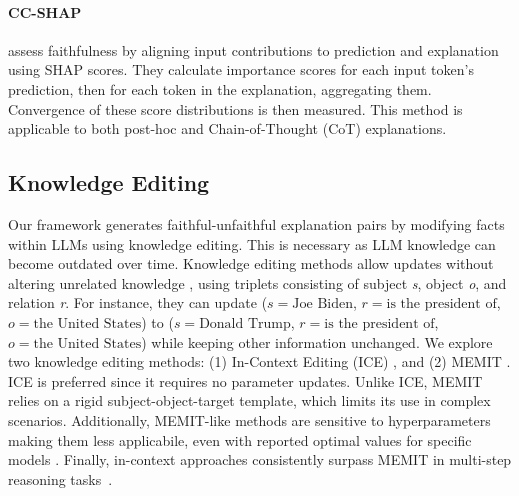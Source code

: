 \paragraph{CC-SHAP} \citet{Parcalabescu2023OnMF} assess faithfulness by aligning input contributions to prediction and explanation using SHAP \citep{Lundberg2017AUA} scores. They calculate importance scores for each input token's prediction, then for each token in the explanation, aggregating them. Convergence of these score distributions is then measured. This method is applicable to both post-hoc and Chain-of-Thought (CoT) explanations.



\subsection{Knowledge Editing}
Our framework generates faithful-unfaithful explanation pairs by modifying facts within LLMs using knowledge editing. This is necessary as LLM knowledge can become outdated over time.  
Knowledge editing methods allow updates without altering unrelated knowledge \citep{cohen2024evaluating,Zhang2024ACS, Patil2023CanSI, geva-etal-2023-dissecting, gupta-etal-2023-editing, hartvigsen2023aging,zheng-etal-2023-edit, Meng2022LocatingAE, mitchell2022fast}, using triplets consisting of subject \textit{s}, object \textit{o}, and relation \textit{r}. For instance, they can update ($s = \text{Joe Biden}$, $r = \text{is the president of}$, $o = \text{the United States}$) to ($s = \text{Donald Trump}$, $r = \text{is the president of}$, $o = \text{the United States}$) while keeping other information unchanged. We explore two knowledge editing methods: (1) In-Context Editing (ICE) \citep{Cohen2023EvaluatingTR}, and (2) MEMIT \citep{meng2023memit}. ICE is preferred since it requires no parameter updates. Unlike ICE, MEMIT relies on a rigid subject-object-target template, which limits its use in complex scenarios. Additionally, MEMIT-like methods are sensitive to hyperparameters making them less applicabile, even with reported optimal values for specific models \citep{Wang2023EasyEditAE}. Finally, in-context approaches consistently surpass MEMIT in multi-step reasoning tasks~\cite{Cohen2023EvaluatingTR}.